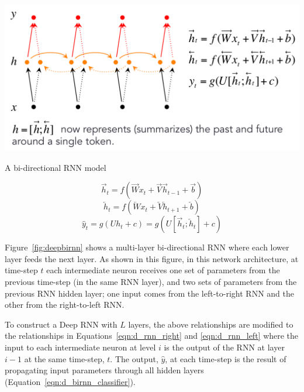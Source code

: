 \documentclass{tufte-handout}
\begin{document}
\begin{marginfigure}
	\centering
	\includegraphics[width=\linewidth]{birnn.pdf}
	\caption {A bi-directional RNN model}
	\label{fig:birnn}
\end{marginfigure}

\begin{equation}
	\overrightarrow{h}_t = f(\overrightarrow{W} x_t + \overrightarrow{V} \overrightarrow{h}_{t-1} + \overrightarrow{b})
	\label{eqn:rnn_right}
\end{equation}
\begin{equation}
	\overleftarrow{h}_t = f(\overleftarrow{W} x_t + \overleftarrow{V} \overleftarrow{h}_{t+1} + \overleftarrow{b})
	\label{eqn:rnn_left}
\end{equation}
\begin{equation}
	\hat{y}_t = g(U h_t + c) = g(U [\overrightarrow{h}_t; \overleftarrow{h}_t] + c)
	\label{eqn:birnn_classifier}
\end{equation}

Figure~\ref{fig:deepbirnn} shows a multi-layer bi-directional RNN where each lower layer feeds the next layer. As shown in this figure, in this network architecture, at time-step $t$ each intermediate neuron receives one set of parameters from the previous time-step (in the same RNN layer), and two sets of parameters from the previous RNN hidden layer; one input comes from the left-to-right RNN and the other from the right-to-left RNN.  

To construct a Deep RNN with $L$ layers, the above relationships are modified to the relationships in Equations~\ref{eqn:d_rnn_right} and \ref{eqn:d_rnn_left} where the input to each intermediate neuron at level $i$ is the output of the RNN at layer $i-1$ at the same time-step, $t$. The output, $\hat{y}$, at each time-step is the result of propagating input parameters through all hidden layers (Equation~\ref{eqn:d_birnn_classifier}).
\end{document}
